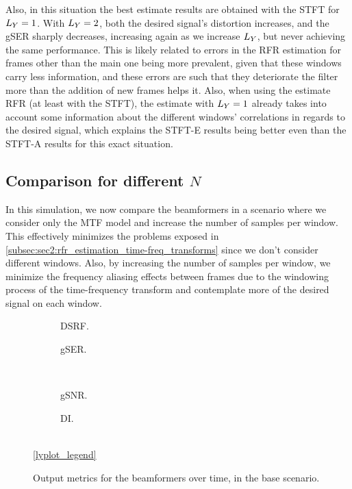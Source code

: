 Also, in this situation the best estimate results are obtained with the STFT for $\Ly = 1$. With $\Ly = 2$, both the desired signal's distortion increases, and the gSER sharply decreases, increasing again as we increase $\Ly$, but never achieving the same performance. This is likely related to errors in the RFR estimation for frames other than the main one being more prevalent, given that these windows carry less information, and these errors are such that they deteriorate the filter more than the addition of new frames helps it. Also, when using the estimate RFR (at least with the STFT), the estimate with $\Ly = 1$ already takes into account some information about the different windows' correlations in regards to the desired signal, which explains the STFT-E results being better even than the STFT-A results for this exact situation.


\subsection{Comparison for different $N$}

In this simulation, we now compare the beamformers in a scenario where we consider only the MTF model and increase the number of samples per window. This effectively minimizes the problems exposed in \cref{subsec:sec2:rfr_estimation_time-freq_transforms} since we don't consider different windows. Also, by increasing the number of samples per window, we minimize the frequency aliasing effects between frames due to the windowing process of the time-frequency transform and contemplate more of the desired signal on each window.
\begin{figure}[!ht]
	\centering
	\begin{subfigure}{0.49\textwidth}
		\centering
		
		\caption{DSRF.}
		\label{subfig:lineplot__DSRF__N_var__iSER_n15__Ly_1}
	\end{subfigure}\hfill
	\begin{subfigure}{0.49\textwidth}
		\centering
		
		\caption{gSER.}
		\label{subfig:lineplot__gSER__N_var__iSER_n15__Ly_1}
	\end{subfigure}\\[1em]
	\begin{subfigure}{0.49\textwidth}
		\centering
		
		\caption{gSNR.}
		\label{subfig:lineplot__gSNR__N_var__iSER_n15__Ly_1}
	\end{subfigure}\hfill
	\begin{subfigure}{0.49\textwidth}
		\centering
		
		\caption{DI.}
		\label{subfig:lineplot__DI__N_var__iSER_n15__Ly_1}
	\end{subfigure}\\[1em]
	\ref*{lyplot_legend}
	\caption{Output metrics for the beamformers over time, in the base scenario.}
	\label{fig:lineplot__N_var__iSER_n15__Ly_1}
\end{figure}

